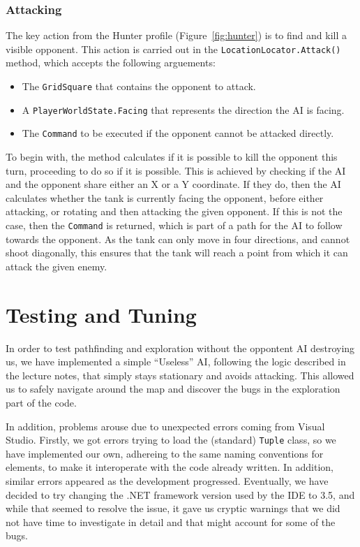 \documentclass[11pt]{article}
\begin{document}
\subsubsection{Attacking}

The key action from the Hunter profile (Figure~\ref{fig:hunter}) is to find and kill a visible opponent. This action is carried out in the \verb|LocationLocator.Attack()| method, which accepts the following arguements:
\begin{itemize}
\item The \verb|GridSquare| that contains the opponent to attack.
\item A \verb|PlayerWorldState.Facing| that represents the direction the AI is facing.
\item The \verb|Command| to be executed if the opponent cannot be attacked directly.
\end{itemize}

To begin with, the method calculates if it is possible to kill the opponent this turn, proceeding to do so if it is possible. This is achieved by checking if the AI and the opponent share either an X or a Y coordinate. If they do, then the AI calculates whether the tank is currently facing the opponent, before either attacking, or rotating and then attacking the given opponent. If this is not the case, then the \verb|Command| is returned, which is part of a path for the AI to follow towards the opponent. As the tank can only move in four directions, and cannot shoot diagonally, this ensures that the tank will reach a point from which it can attack the given enemy.

\section{Testing and Tuning}

In order to test pathfinding and exploration without the oppontent AI destroying us, we have implemented a simple ``Useless'' AI, following the logic described in the lecture notes, that simply stays stationary and avoids attacking. This allowed us to safely navigate around the map and discover the bugs in the exploration part of the code.

In addition, problems arouse due to unexpected errors coming from Visual Studio. Firstly, we got errors trying to load the (standard) \verb|Tuple| class, so we have implemented our own, adhereing to the same naming conventions for elements\cite{cSharpTuple}, to make it interoperate with the code already written. In addition, similar errors appeared as the development progressed. Eventually, we have decided to try changing the .NET framework version used by the IDE to 3.5, and while that seemed to resolve the issue, it gave us cryptic warnings that we did not have time to investigate in detail and that might account for some of the bugs.
\end{document}
